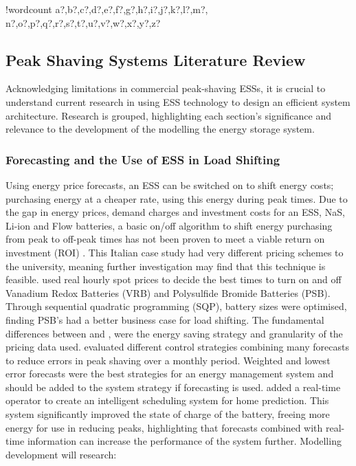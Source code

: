 \documentclass[fontsize=9.5pt]{extarticle}
\numberwithin{figure}{section} %
\newcounter{words}
\newenvironment{counted}{%
  \setcounter{words}{0}
  \SearchList!{wordcount}{\stepcounter{words}}
    {a?,b?,c?,d?,e?,f?,g?,h?,i?,j?,k?,l?,m?,
    n?,o?,p?,q?,r?,s?,t?,u?,v?,w?,x?,y?,z?}
  \UndoBoundary{'}
  \SearchOrder{p;}}{%
  \StopSearching}
\begin{document}
\begin{counted}
\subsection{Peak Shaving Systems Literature
Review}\label{peak-shaving-systems-literature-review}

Acknowledging limitations in commercial peak-shaving ESSs, it is crucial
to understand current research in using ESS technology to design an
efficient system architecture. Research is grouped, highlighting each
section's significance and relevance to the development of the modelling
the energy storage system.

\subsubsection{Forecasting and the Use of ESS in Load
Shifting}\label{forecasting-and-the-use-of-ess-in-load-shifting}

Using energy price forecasts, an ESS can be switched on to shift energy
costs; purchasing energy at a cheaper rate, using this energy during
peak times. Due to the gap in energy prices, demand charges and
investment costs for an ESS, NaS, Li-ion and Flow batteries, a basic
on/off algorithm to shift energy purchasing from peak to off-peak times
has not been proven to meet a viable return on investment (ROI)
\cite{7555795}. This Italian case study had very different pricing
schemes to the university, meaning further investigation may find that
this technique is feasible. \cite{5590194} used real hourly spot prices
to decide the best times to turn on and off Vanadium Redox Batteries
(VRB) and Polysulfide Bromide Batteries (PSB). Through sequential
quadratic programming (SQP), battery sizes were optimised, finding PSB's
had a better business case for load shifting. The fundamental
differences between \cite{7555795} and \cite{5590194}, were the energy
saving strategy and granularity of the pricing data used. \cite{6938948}
evaluated different control strategies combining many forecasts to
reduce errors in peak shaving over a monthly period. Weighted and lowest
error forecasts were the best strategies for an energy management system
and should be added to the system strategy if forecasting is used.
\cite{Bennett2015122} added a real-time operator to create an
intelligent scheduling system for home prediction. This system
significantly improved the state of charge of the battery, freeing more
energy for use in reducing peaks, highlighting that forecasts combined
with real-time information can increase the performance of the system
further. Modelling development will research:


\end{counted}
\end{document}
